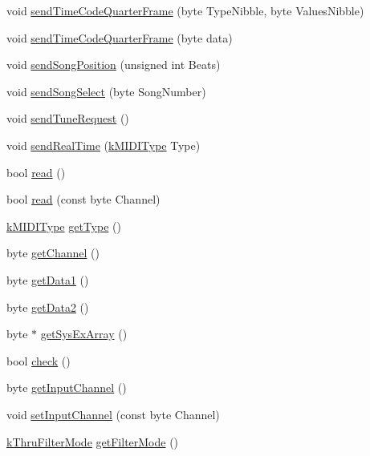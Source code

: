 \begin{CompactItemize}
\item 
void \hyperlink{class_m_i_d_i___class_d9b1bd53330652f0360a0a6ed80b5b9d}{sendTimeCodeQuarterFrame} (byte TypeNibble, byte ValuesNibble)
\item 
void \hyperlink{class_m_i_d_i___class_1f720df72c5253d85d1d547d09357ea0}{sendTimeCodeQuarterFrame} (byte data)
\item 
void \hyperlink{class_m_i_d_i___class_0b9a6c3437016b8dc9678d6c43ca693f}{sendSongPosition} (unsigned int Beats)
\item 
void \hyperlink{class_m_i_d_i___class_0b957074192d439e8e69af9eef6fab77}{sendSongSelect} (byte SongNumber)
\item 
void \hyperlink{class_m_i_d_i___class_9d9a51ca4a888c7c4c0d91a9e678c751}{sendTuneRequest} ()
\item 
void \hyperlink{class_m_i_d_i___class_e9086dd31c41ea773925a069dbd0080b}{sendRealTime} (\hyperlink{_m_i_d_i_8h_802feb46a169642d43b2415d02390545}{kMIDIType} Type)
\item 
bool \hyperlink{class_m_i_d_i___class_8e7be5af3a32cb91f596dbb8d8c297bf}{read} ()
\item 
bool \hyperlink{class_m_i_d_i___class_581b5b973cd81e5aa9d6b91c220342b7}{read} (const byte Channel)
\item 
\hyperlink{_m_i_d_i_8h_802feb46a169642d43b2415d02390545}{kMIDIType} \hyperlink{class_m_i_d_i___class_b43d8c2b277cf2408865b4f63111080b}{getType} ()
\item 
byte \hyperlink{class_m_i_d_i___class_6b7ac8309663b69decfd1bd2925fcbef}{getChannel} ()
\item 
byte \hyperlink{class_m_i_d_i___class_a64038c767252e358decc469ba99d4e3}{getData1} ()
\item 
byte \hyperlink{class_m_i_d_i___class_688f4f57142f1a7dfd1a79bf43e1b74d}{getData2} ()
\item 
byte $\ast$ \hyperlink{class_m_i_d_i___class_4540dd7720884677b50cff2f23d1982a}{getSysExArray} ()
\item 
bool \hyperlink{class_m_i_d_i___class_d5f7a96c5bb338946a0be1d243877155}{check} ()
\item 
byte \hyperlink{class_m_i_d_i___class_f05fb3c0857d2f50d6c21414eb18ef53}{getInputChannel} ()
\item 
void \hyperlink{class_m_i_d_i___class_35a66d47ba598c7ebbee7fbf654dafe8}{setInputChannel} (const byte Channel)
\item 
\hyperlink{_m_i_d_i_8h_315ccd12c0a15c11eca5cc4acdb6397d}{kThruFilterMode} \hyperlink{class_m_i_d_i___class_8952fc757cefe98856ba7cfc811bbbb3}{getFilterMode} ()

\end{CompactItemize}
